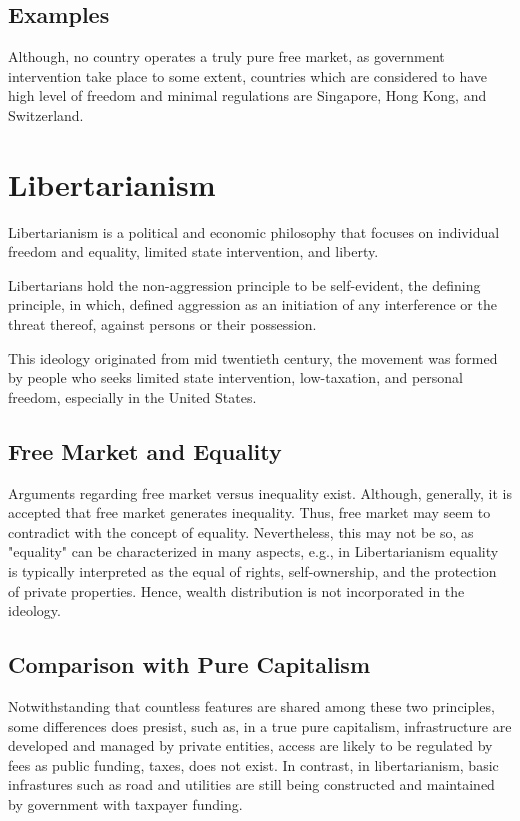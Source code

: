 \documentclass[12pt,twocolumn,a4paper]{article}
\begin{document}
\subsection{Examples}
Although, no country operates a truly pure free market, as government intervention take place to some extent, countries which are considered to have high level of freedom and minimal regulations are Singapore, Hong Kong, and Switzerland.

\section{Libertarianism}
Libertarianism is a political and economic philosophy that focuses on individual freedom and equality, limited state intervention, and liberty.

Libertarians hold the non-aggression principle to be self-evident, the defining principle, in which, defined aggression as an initiation of any interference or the threat thereof, against persons or their possession.

This ideology originated from mid twentieth century, the movement was formed by people who seeks limited state intervention, low-taxation, and personal freedom, especially in the United States.
\subsection{Free Market and Equality}
Arguments regarding free market versus inequality exist. Although, generally, it is accepted that free market generates inequality. Thus, free market may seem to contradict with the concept of equality. Nevertheless, this may not be so, as "equality" can be characterized in many aspects, e.g., in Libertarianism equality is typically interpreted as the equal of rights, self-ownership, and the protection of private properties. Hence, wealth distribution is not incorporated in the ideology.
\subsection{Comparison with Pure Capitalism}
Notwithstanding that countless features are shared among these two principles, some differences does presist, such as, in a true pure capitalism, infrastructure are developed and managed by private entities, access are likely to be regulated by fees as public funding, taxes, does not exist. In contrast, in libertarianism, basic infrastures such as road and utilities are still being constructed and maintained by government with taxpayer funding.
\end{document}
